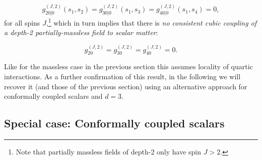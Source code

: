 \documentclass[11pt,a4paper]{article}
\begin{document}
\begin{equation}
    g^{\left(J,2\right)}_{20|0}(s_1,s_2)=g^{\left(J,2\right)}_{30|0}(s_1,s_3)=g^{\left(J,2\right)}_{40|0}(s_1,s_4)=0,
\end{equation}
for all spins $J$,\footnote{Note that partially massless fields of depth-2 only have spin $J>2$.} which in turn implies that there is \emph{no consistent cubic coupling of a depth-2 partially-massless field to scalar matter}:
\begin{shaded}
\begin{equation}
    g^{\left(J,2\right)}_{20}=g^{\left(J,2\right)}_{30}=g^{\left(J,2\right)}_{40}=0.
\end{equation}
\end{shaded}
\noindent Like for the massless case in the previous section this assumes locality of quartic interactions. As a further confirmation of this result, in the following we will recover it (and those of the previous section) using an alternative approach for conformally coupled scalars and $d=3$.


\subsection{Special case: Conformally coupled scalars}
\end{document}
